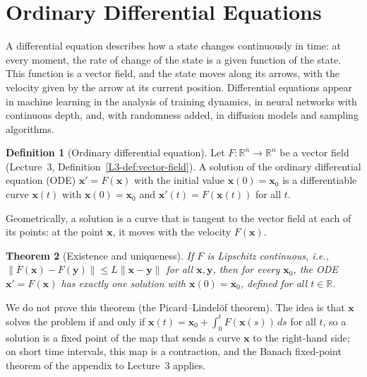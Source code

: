 \documentclass[11pt]{article}
\newcommand{\norm}[1]{\lVert #1 \rVert}
\theoremstyle{definition}
\newtheorem{definition}{Definition}[section]
\theoremstyle{plain}
\newtheorem{theorem}[definition]{Theorem}
\theoremstyle{remark}
\begin{document}
\section{Ordinary Differential Equations}\label{sec:ode}

A differential equation describes how a state changes continuously in time: at every moment, the rate of change of the state is a given function of the state. This function is a vector field, and the state moves along its arrows, with the velocity given by the arrow at its current position. Differential equations appear in machine learning in the analysis of training dynamics, in neural networks with continuous depth, and, with randomness added, in diffusion models and sampling algorithms.

\begin{definition}[Ordinary differential equation]\label{def:ode}
    Let $F: \mathbb{R}^n \to \mathbb{R}^n$ be a vector field (Lecture~3, Definition~\ref{L3-def:vector-field}). A solution of the ordinary differential equation (ODE) $\mathbf{x}' = F(\mathbf{x})$ with the initial value $\mathbf{x}(0) = \mathbf{x}_0$ is a differentiable curve $\mathbf{x}(t)$ with $\mathbf{x}(0) = \mathbf{x}_0$ and $\mathbf{x}'(t) = F(\mathbf{x}(t))$ for all $t$.
\end{definition}

Geometrically, a solution is a curve that is tangent to the vector field at each of its points: at the point $\mathbf{x}$, it moves with the velocity $F(\mathbf{x})$.

\begin{theorem}[Existence and uniqueness]\label{thm:picard}
    If $F$ is Lipschitz continuous, i.e., $\norm{F(\mathbf{x}) - F(\mathbf{y})} \leq L\norm{\mathbf{x} - \mathbf{y}}$ for all $\mathbf{x}, \mathbf{y}$, then for every $\mathbf{x}_0$, the ODE $\mathbf{x}' = F(\mathbf{x})$ has exactly one solution with $\mathbf{x}(0) = \mathbf{x}_0$, defined for all $t \in \mathbb{R}$.
\end{theorem}

We do not prove this theorem (the Picard--Lindel\"of theorem). The idea is that $\mathbf{x}$ solves the problem if and only if $\mathbf{x}(t) = \mathbf{x}_0 + \int_0^t F(\mathbf{x}(s))\, ds$ for all $t$, so a solution is a fixed point of the map that sends a curve $\mathbf{x}$ to the right-hand side; on short time intervals, this map is a contraction, and the Banach fixed-point theorem of the appendix to Lecture~3 applies.
\end{document}
